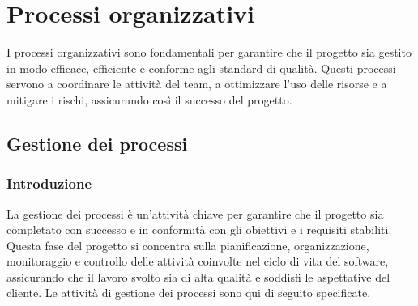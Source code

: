 \section{Processi organizzativi}
I processi organizzativi sono fondamentali per garantire che il progetto sia gestito in modo efficace, efficiente e conforme agli standard di qualità. Questi processi servono a coordinare le attività del team, a ottimizzare l'uso delle risorse e a mitigare i rischi, assicurando così il successo del progetto. 
\subsection{Gestione dei processi}
\subsubsection{Introduzione}
La gestione dei processi è un'attività chiave per garantire che il progetto sia completato con successo e in conformità con gli obiettivi e i requisiti stabiliti. Questa fase del progetto si concentra sulla pianificazione, organizzazione, monitoraggio e controllo delle attività coinvolte nel ciclo di vita del software, assicurando che il lavoro svolto sia di alta qualità e soddisfi le aspettative del cliente. Le attività di gestione dei processi sono qui di seguito specificate.
